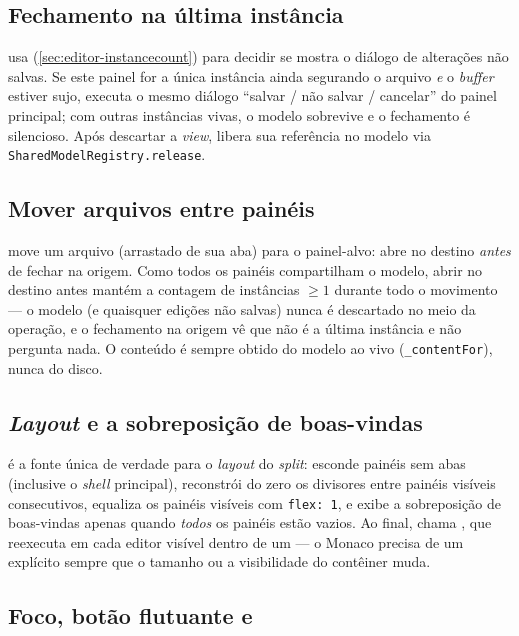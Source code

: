 \subsection{Fechamento na última instância}

 usa 
(\autoref{sec:editor-instancecount}) para decidir se mostra o diálogo de
alterações não salvas. Se este painel for a única instância ainda segurando o
arquivo \emph{e} o \emph{buffer} estiver sujo, executa o mesmo diálogo
\enquote{salvar / não salvar / cancelar} do painel principal; com outras
instâncias vivas, o modelo sobrevive e o fechamento é silencioso. Após descartar
a \emph{view}, libera sua referência no modelo via
\lstinline|SharedModelRegistry.release|.

\subsection{Mover arquivos entre painéis}

 move um arquivo (arrastado de
sua aba) para o painel-alvo: abre no destino \emph{antes} de fechar na origem.
Como todos os painéis compartilham o modelo, abrir no destino antes mantém a
contagem de instâncias $\geq 1$ durante todo o movimento --- o modelo (e
quaisquer edições não salvas) nunca é descartado no meio da operação, e o
fechamento na origem vê que não é a última instância e não pergunta nada. O
conteúdo é sempre obtido do modelo ao vivo (\lstinline|_contentFor|), nunca do
disco.

\subsection{\emph{Layout} e a sobreposição de boas-vindas}

 é a fonte única de verdade para o \emph{layout} do
\emph{split}: esconde painéis sem abas (inclusive o \emph{shell} principal),
reconstrói do zero os divisores entre painéis visíveis consecutivos, equaliza os
painéis visíveis com \lstinline|flex: 1|, e exibe a sobreposição de boas-vindas
apenas quando \emph{todos} os painéis estão vazios. Ao final, chama
, que reexecuta  em cada editor
visível dentro de um  --- o Monaco precisa de um
 explícito sempre que o tamanho ou a visibilidade do contêiner
muda.

\subsection{Foco, botão flutuante e }


